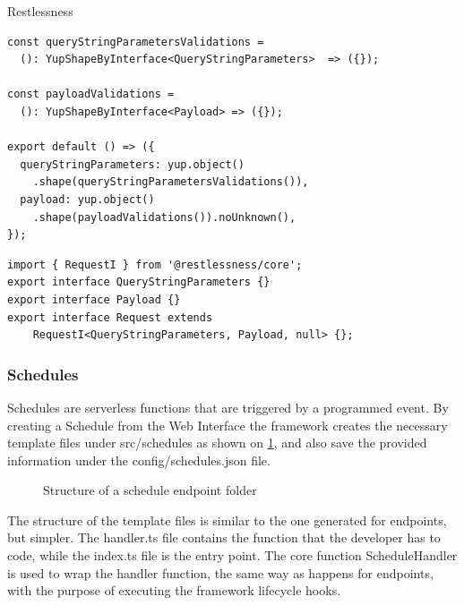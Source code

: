 \begin{chapter}{Restlessness}
    \bigskip
    \begin{lstlisting}[caption=validations.ts content, label={lst:validations_ts}]
const queryStringParametersValidations =
  (): YupShapeByInterface<QueryStringParameters>  => ({});

const payloadValidations =
  (): YupShapeByInterface<Payload> => ({});

export default () => ({
  queryStringParameters: yup.object()
    .shape(queryStringParametersValidations()),
  payload: yup.object()
    .shape(payloadValidations()).noUnknown(),
});
    \end{lstlisting}

    \bigskip
    \begin{lstlisting}[caption=interfaces.ts content, label={lst:interfaces_ts}]
import { RequestI } from '@restlessness/core';
export interface QueryStringParameters {}
export interface Payload {}
export interface Request extends
    RequestI<QueryStringParameters, Payload, null> {};
    \end{lstlisting}

    \subsubsection{Schedules}
    \label{subsec:schedules}
    Schedules are serverless functions that are triggered by a programmed event.
    By creating a Schedule from the Web Interface the framework creates the necessary
    template files under src/schedules as shown on \ref{fig:new_schedule_folder_structure},
    and also save the provided information under the config/schedules.json file.

    \begin{figure}
        \begin{minipage}{\linewidth}
        \end{minipage}
        \caption{Structure of a schedule endpoint folder}
        \label{fig:new_schedule_folder_structure}
    \end{figure}

    The structure of the template files is similar to the one generated for endpoints,
    but simpler. The handler.ts file contains the function that the developer has
    to code, while the index.ts file is the entry point.
    The core function ScheduleHandler is used to wrap the handler function, the same
    way as happens for endpoints, with the purpose of executing the framework lifecycle
    hooks.


\end{chapter}

